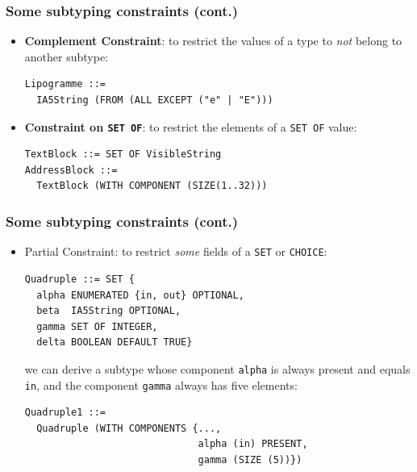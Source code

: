 \documentclass[compress,dvips,xcolor={dvipsnames},t]{beamer}
\begin{document}
\begin{frame}[containsverbatim]
\frametitle{Some subtyping constraints (cont.)}

\begin{itemize}

  \item \textbf{Complement Constraint}: to restrict the values of a
        type to \emph{not} belong to another subtype:

\begin{verbatim}
Lipogramme ::=
  IA5String (FROM (ALL EXCEPT ("e" | "E")))
\end{verbatim}

\bigskip\bigskip

  \item \textbf{Constraint on \texttt{SET OF}}: to restrict the
        elements of a \texttt{SET OF} value:

\begin{verbatim}
TextBlock ::= SET OF VisibleString
AddressBlock ::=
  TextBlock (WITH COMPONENT (SIZE(1..32)))
\end{verbatim}

\end{itemize}

\end{frame}

\begin{frame}[containsverbatim]
\frametitle{Some subtyping constraints (cont.)}

\begin{itemize}
  \item \textsf{Partial Constraint}: to restrict \emph{some} fields
        of a \texttt{SET} or \texttt{CHOICE}:

\begin{verbatim}
Quadruple ::= SET {
  alpha ENUMERATED {in, out} OPTIONAL,
  beta  IA5String OPTIONAL,
  gamma SET OF INTEGER,
  delta BOOLEAN DEFAULT TRUE}
\end{verbatim}

we can derive a subtype whose component \verb+alpha+ is always present
and equals \verb+in+, and the component \verb+gamma+ always has
five elements:
\begin{verbatim}
Quadruple1 ::=
  Quadruple (WITH COMPONENTS {...,
                              alpha (in) PRESENT,
                              gamma (SIZE (5))})
\end{verbatim}

\end{itemize}

\end{frame}
\end{document}
